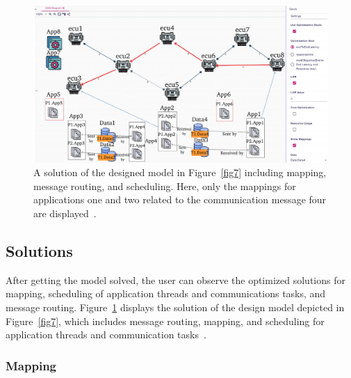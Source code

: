     \begin{figure}[t]
 	\centering
 	\includegraphics[width=1\columnwidth]{figures/ee_model_path.pdf}
 	\caption{A solution of the designed model in Figure~\ref{fig7} including mapping, message routing, and scheduling. Here, only the mappings for applications one and two related to the communication message four are displayed~\cite{askaripoor2023designer}.}
 	\label{fig8}
    \end{figure}
    

    \subsection{Solutions}
     After getting the model solved, the user can observe the optimized solutions for mapping, scheduling of application threads and communications tasks, and message routing. Figure~\ref{fig8} displays the solution of the design model depicted in Figure~\ref{fig7}, which includes message routing, mapping, and scheduling for application threads and communication tasks~\cite{askaripoor2023designer}.

    
    \subsubsection{Mapping}
    
        
